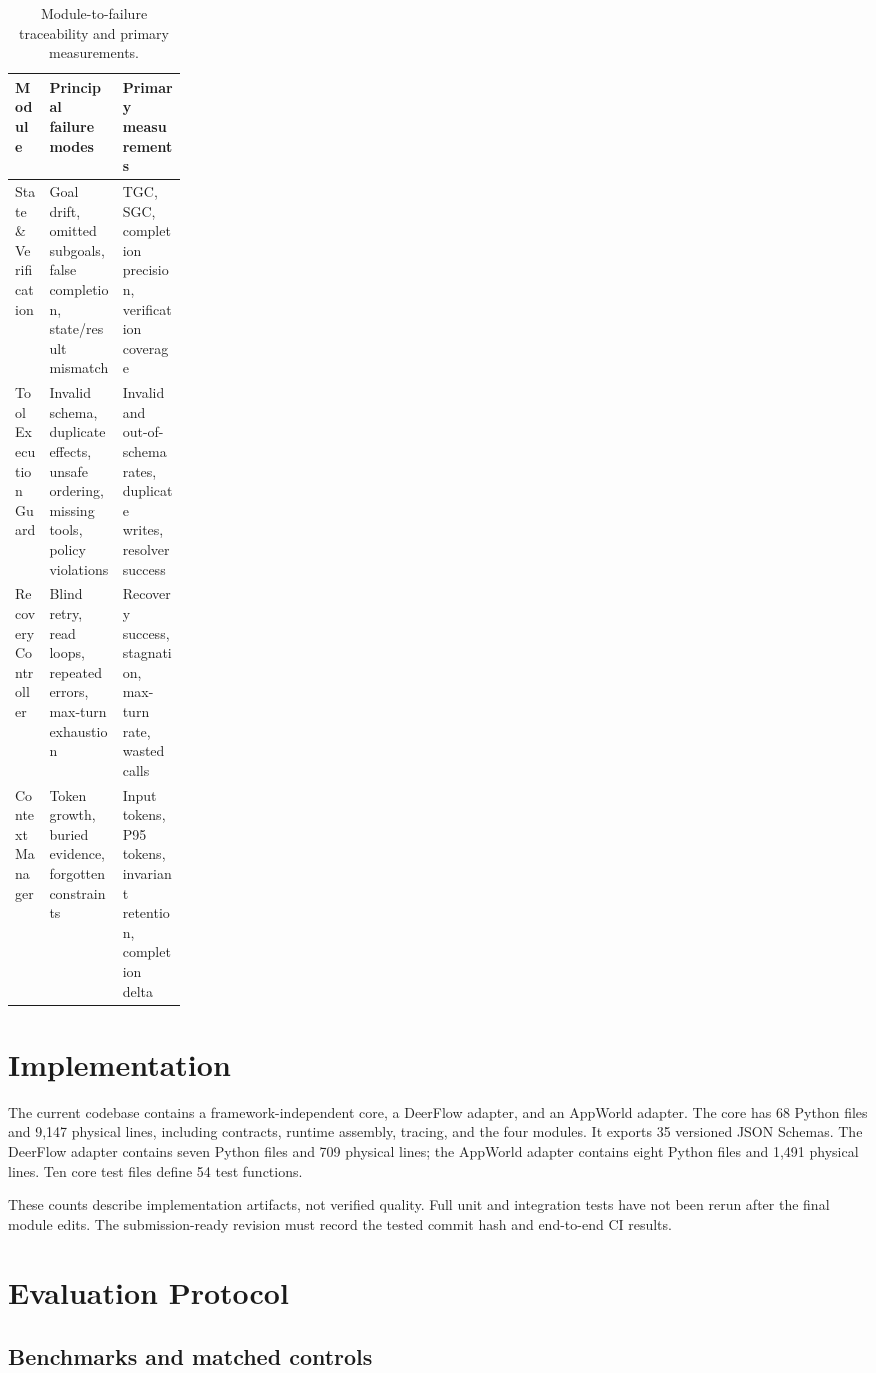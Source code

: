 \documentclass[10pt]{article}
\begin{document}
\begin{table}[t]
\centering
\caption{Module-to-failure traceability and primary measurements.}
\label{tab:modules}
\small
\begin{tabularx}{\linewidth}{@{}p{0.20\linewidth}YY@{}}
\toprule
Module & Principal failure modes & Primary measurements \\
\midrule
State \& Verification & Goal drift, omitted subgoals, false completion,
state/result mismatch & TGC, SGC, completion precision, verification coverage \\
Tool Execution Guard & Invalid schema, duplicate effects, unsafe ordering,
missing tools, policy violations & Invalid and out-of-schema rates, duplicate
writes, resolver success \\
Recovery Controller & Blind retry, read loops, repeated errors, max-turn
exhaustion & Recovery success, stagnation, max-turn rate, wasted calls \\
Context Manager & Token growth, buried evidence, forgotten constraints & Input
tokens, P95 tokens, invariant retention, completion delta \\
\bottomrule
\end{tabularx}
\end{table}

\section{Implementation}

The current codebase contains a framework-independent core, a DeerFlow adapter,
and an AppWorld adapter. The core has 68 Python files and 9,147 physical lines,
including contracts, runtime assembly, tracing, and the four modules. It exports
35 versioned JSON Schemas. The DeerFlow adapter contains seven Python files and
709 physical lines; the AppWorld adapter contains eight Python files and 1,491
physical lines. Ten core test files define 54 test functions.

These counts describe implementation artifacts, not verified quality. Full unit
and integration tests have not been rerun after the final module edits. The
submission-ready revision must record the tested commit hash and end-to-end CI
results.

\section{Evaluation Protocol}

\subsection{Benchmarks and matched controls}
\end{document}
